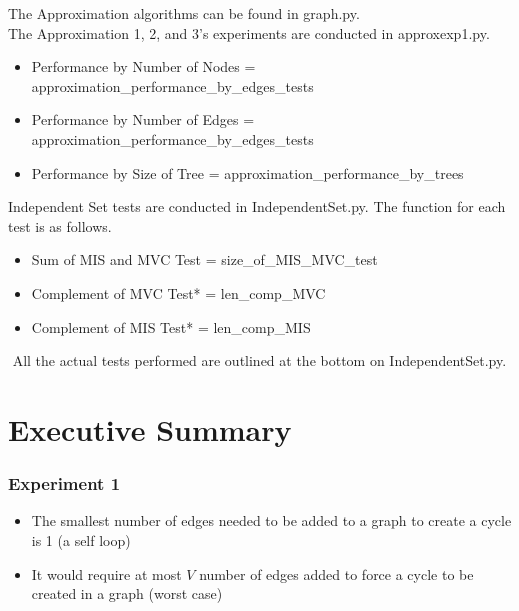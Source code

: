 \documentclass[12pt]{article}
\begin{document}

The Approximation algorithms can be found in graph.py. \\
The Approximation 1, 2, and 3's experiments are conducted in approxexp1.py.
\\
\begin{itemize}
    \item Performance by Number of Nodes = approximation\_performance\_by\_edges\_tests\(\)
    \item Performance by Number of Edges = approximation\_performance\_by\_edges\_tests\(\)
    \item Performance by Size of Tree = approximation\_performance\_by\_trees\(\)
\end{itemize}



Independent Set tests are conducted in IndependentSet.py.
The function for each test is as follows.
\begin{itemize}
    \item Sum of MIS and MVC Test = size\_of\_MIS\_MVC\_test\(\)
    \item Complement of MVC Test* = len\_comp\_MVC\(\)
    \item Complement of MIS Test* = len\_comp\_MIS\(\)
\end{itemize}
$ $
\newline
All the actual tests performed are outlined at the bottom on IndependentSet.py.



\newpage
\section{Executive Summary}

\subsubsection{Experiment 1}
\begin{itemize}
    \item The smallest number of edges needed to be added to a graph to create a cycle is 1 (a self loop)
    \item It would require at most $V$ number of edges added to force a cycle to be created in a graph (worst case) 
  \end{itemize}
\end{document}

